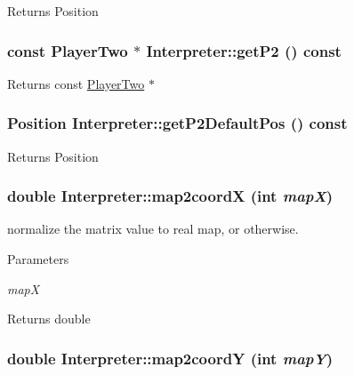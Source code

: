 \label{classInterpreter_a2b46c460756f87d2dcef4ea8d8d49aaa}
\begin{DoxyReturn}{Returns}
Position 
\end{DoxyReturn}
\hypertarget{classInterpreter_aa34b7799a25a0174b82690d09ce065f1}{
\subsubsection[{getP2}]{\setlength{\rightskip}{0pt plus 5cm}const {\bf PlayerTwo} $\ast$ Interpreter::getP2 () const}}
\label{classInterpreter_aa34b7799a25a0174b82690d09ce065f1}
\begin{DoxyReturn}{Returns}
const \hyperlink{classPlayerTwo}{PlayerTwo} $\ast$ 
\end{DoxyReturn}
\hypertarget{classInterpreter_ade297117d2ee20f524dd184ddd152c6d}{
\subsubsection[{getP2DefaultPos}]{\setlength{\rightskip}{0pt plus 5cm}Position Interpreter::getP2DefaultPos () const}}
\label{classInterpreter_ade297117d2ee20f524dd184ddd152c6d}
\begin{DoxyReturn}{Returns}
Position 
\end{DoxyReturn}
\hypertarget{classInterpreter_afaaf3930191f9ba3e48a09af193e0a39}{
\subsubsection[{map2coordX}]{\setlength{\rightskip}{0pt plus 5cm}double Interpreter::map2coordX (int {\em mapX})}}
\label{classInterpreter_afaaf3930191f9ba3e48a09af193e0a39}


normalize the matrix value to real map, or otherwise. 


\begin{DoxyParams}{Parameters}
\item[{\em mapX}]\end{DoxyParams}
\begin{DoxyReturn}{Returns}
double 
\end{DoxyReturn}
\hypertarget{classInterpreter_abd0885c42ade8eb7f941c8d4b26a2501}{
\subsubsection[{map2coordY}]{\setlength{\rightskip}{0pt plus 5cm}double Interpreter::map2coordY (int {\em mapY})}}
\label{classInterpreter_abd0885c42ade8eb7f941c8d4b26a2501}


